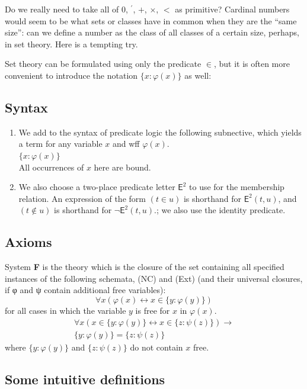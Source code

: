 \documentclass[12pt]{report}
\theoremstyle{nonumberplain}
\renewcommand{\o}[1]{\mathsf{#1}}
\begin{document}
Do we really need to take all of 0, $^\prime$, $+$, $×$, $<$ as primitive? Cardinal numbers would seem to be what sets or classes have in common when they are the ``same size'': can we define a number as the class of all classes of a certain size, perhaps, in set theory. Here is a tempting try.

Set theory can be formulated using only the predicate $∈$, but it is often more convenient to introduce the notation $\{x:φ(x)\}$ as well:

\subsection*{Syntax}
\begin{enumerate}[label=\arabic*.]
\item We add to the syntax of predicate logic the following subnective, which yields a term for any variable $x$ and wff $φ(x)$.\\
\phantom{.}\hfill$\{x : φ(x)\}$\hfill\phantom{.}\\
All occurrences of $x$ here are bound.
\item We also choose a two-place predicate letter $\o{E}^2$ to use for the membership relation. An expression of the form $(t ∈u)$ is shorthand for $\o{E}^2(t , u)$, and $(t  ∉ u)$ is shorthand for $¬\o{E}^2(t , u)$.; we also use the identity predicate.
\end{enumerate}
\subsection*{Axioms}
System \textbf{F} is the theory which is the closure of the set containing all specified instances of the following schemata, (NC) and (Ext) (and their universal closures, if φ and ψ contain additional free variables):
\begin{equation}
∀x (φ(x) ↔ x ∈\{y : φ(y)\}) \tag{NC}
\end{equation}
\noindent for all cases in which the variable $y$ is free for $x$ in $φ(x)$.
\begin{multline}
∀x (x ∈\{y : φ(y)\} ↔  x ∈ \{z : ψ (z)\}) → \\
\{y : φ(y)\} = \{z : ψ(z)\} \tag{Ext}
\end{multline}
where $\{y : φ(y)\}$  and $\{z : ψ (z)\}$ do not contain $x$ free.

\subsection*{Some intuitive definitions}
\end{document}
